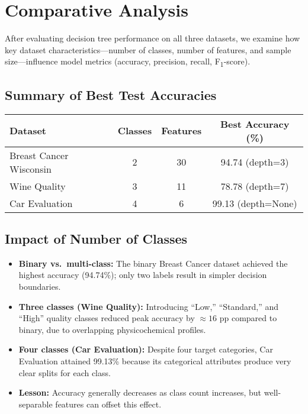 \pagebreak
\section{Comparative Analysis}

After evaluating decision tree performance on all three datasets, we examine how key dataset characteristics—number of classes, number of features, and sample size—influence model metrics (accuracy, precision, recall, F\textsubscript{1}-score).

\subsection{Summary of Best Test Accuracies}
\begin{center}
	\renewcommand{\arraystretch}{1.2}
	\begin{tabular}{|l|c|c|c|}
		\hline
		\textbf{Dataset}        & \textbf{Classes} & \textbf{Features} & \textbf{Best Accuracy (\%)} \\\hline
		Breast Cancer Wisconsin & 2                & 30                & 94.74 (depth=3)             \\\hline
		Wine Quality            & 3                & 11                & 78.78 (depth=7)             \\\hline
		Car Evaluation          & 4                & 6                 & 99.13 (depth=None)          \\\hline
	\end{tabular}
\end{center}

\subsection{Impact of Number of Classes}
\begin{itemize}
	\item \textbf{Binary vs.\ multi-class:}
	      The binary Breast Cancer dataset achieved the highest accuracy (94.74\%); only two labels result in simpler decision boundaries.
	\item \textbf{Three classes (Wine Quality):}
	      Introducing “Low,” “Standard,” and “High” quality classes reduced peak accuracy by \(\approx16\) pp compared to binary, due to overlapping physicochemical profiles.
	\item \textbf{Four classes (Car Evaluation):}
	      Despite four target categories, Car Evaluation attained 99.13\% because its categorical attributes produce very clear splits for each class.
	\item \textbf{Lesson:}
	      Accuracy generally decreases as class count increases, but well-separable features can offset this effect.
\end{itemize}

